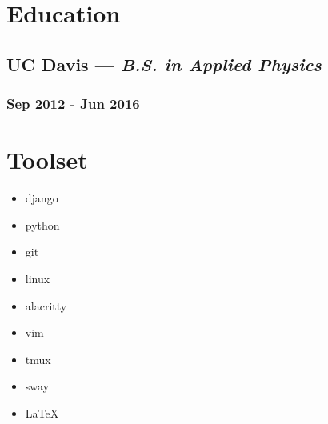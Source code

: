 \documentclass{article}
\begin{document}
\begin{minipage}[t]{.8\textwidth}
\section*{Education}
\subsection*{UC Davis --- \textit{B.S. in Applied Physics}}
\subsubsection*{Sep 2012 - Jun 2016}
\end{minipage}%
\hspace*{0.5cm}
\begin{minipage}[t]{.2\textwidth}
\section*{Toolset}
\vspace{0.8em}
\begin{itemize}
	\item django
    \item python
	\item git
	\item linux
    \item alacritty
    \item vim
    \item tmux
    \item sway
	\item \LaTeX
\end{itemize}
\end{minipage}
\end{document}
